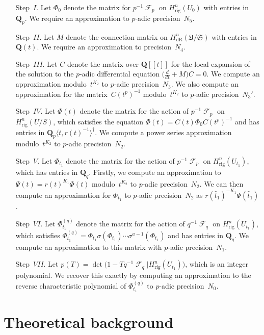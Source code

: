 \documentclass[a4paper,11pt]{article}
\numberwithin{equation}{section}
\DeclareMathOperator{\Frob}{\mathcal{F}} %
\providecommand{\HdR}{H_{\text{dR}}}    %
\providecommand{\Hrig}{H_{\text{rig}}}  %
\theoremstyle{definition}
\begin{document}
\begin{enumerate}
\item[Step~$I$.]
Let $\Phi_0$ denote the matrix for $p^{-1} \Frob_p$ on 
$\Hrig^{n}(U_0)$ with entries in~$\mathbf{Q}_p$.  
We require an approximation to $p$-adic precision~$N_5$.
\item[Step~$II$.]
Let $M$ denote the connection matrix on $\HdR^{n}(\mathfrak{U}/\mathfrak{S})$ 
with entries in~$\mathbf{Q}(t)$.  We require an approximation 
to precision~$N_4$.
\item[Step~$III$.]
Let $C$ denote the matrix over $\mathbf{Q}[[t]]$ for the local 
expansion of the solution to the $p$-adic differential equation 
$\bigl(\tfrac{d}{dt} + M\bigr) C = 0$.  We compute an approximation 
modulo~$t^{K_2}$ to $p$-adic precision~$N_3$.  We also compute an 
approximation for the matrix~$C(t^p)^{-1}$ modulo~$t^{K_2}$ to $p$-adic 
precision~$N_3'$.
\item[Step~$IV$.]
Let $\Phi(t)$ denote the matrix for the action of $p^{-1} \Frob_p$ on 
$\Hrig^{n}(U/S)$, which satisfies the equation 
$\Phi(t) = C(t) \Phi_0 C(t^p)^{-1}$ and has entries in 
$\mathbf{Q}_p\langle t,r(t)^{-1}\rangle^{\dagger}$.  We compute 
a power series approximation modulo~$t^{K_2}$ to $p$-adic precision~$N_2$.
\item[Step~$V$.]
Let $\Phi_{t_1}$ denote the matrix for the action of $p^{-1} \Frob_p$ 
on $\Hrig^{n}(U_{t_1})$, which has entries in $\mathbf{Q}_q$. 
Firstly, we compute an approximation to $\Psi(t) = r(t)^{K_1} \Phi(t)$ 
modulo~$t^{K_2}$ to $p$-adic precision~$N_2$.  We can then compute 
an approximation for $\Phi_{t_1}$ to $p$-adic precision~$N_2$ 
as $r(\hat{t}_1)^{-K_1} \Psi(\hat{t}_1)$.
\item[Step~$VI$.]
Let $\Phi_{t_1}^{(q)}$ denote the matrix for the action of $q^{-1} \Frob_q$ on 
$\Hrig^{n}(U_{t_1})$, which satisfies 
$\Phi_{t_1}^{(q)} = \Phi_{t_1} \sigma(\Phi_{t_1}) \dotsm \sigma^{a-1}(\Phi_{t_1})$ 
and has entries in $\mathbf{Q}_q$.  We compute an approximation to this 
matrix with $p$-adic precision~$N_1$.
\item[Step~$VII$.]
Let $p(T) = \det\bigl(1 - T q^{-1} \Frob_q | \Hrig^n(U_{t_1})\bigr)$, 
which is an integer polynomial.  We recover this exactly 
by computing an approximation to the reverse characteristic polynomial 
of $\Phi_{t_1}^{(q)}$ to $p$-adic precision~$N_0$.
\end{enumerate}

\section{Theoretical background}
\end{document}
